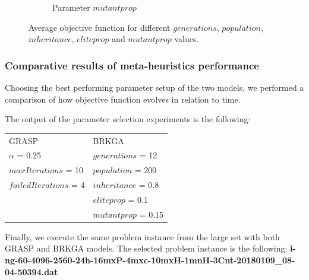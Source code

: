 \begin{figure}[H]
\begin{subfigure}[b]{.49\linewidth}
\caption{Parameter $mutantprop$ }\label{fig2e}
\end{subfigure}%
\caption{Average objective function for different  $generations$,  $population$,  $inheritance$,  $eliteprop$ and  $mutantprop$ values.  }
\label{fig_brkga_params}
\end{figure}





\subsubsection{Comparative results of meta-heuristics performance}

Choosing the best performing parameter setup of the two models, we performed a comparison of how objective function evolves in relation to time.

The output of the parameter selection experiments is the following: 


\begin{tabular}{ll}
GRASP &  BRKGA \\
 $\alpha$ = 0.25  &  $generations$ = 12 \\
 $maxIterations$ = 10 &  $population$ = 200 \\
 $failedIterations$ = 4 & $inheritance$ = 0.8 \\
 						&  $eliteprop$ = 0.1 \\
 						& $mutantprop$ = 0.15 \\


\end{tabular}

Finally, we execute the same problem instance from the large set with both GRASP and BRKGA models. The selected problem instance is the following: \textbf{i-ng-60-4096-2560-24h-16mxP-4mxc-10mxH-1mnH-3Cnt-20180109\_08-04-50394.dat }



